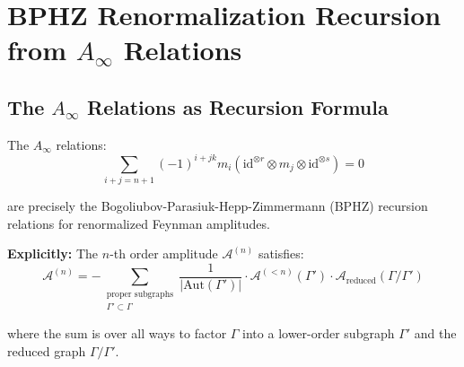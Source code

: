 
\section{BPHZ Renormalization Recursion from $A_\infty$ Relations}
\label{sec:bphz-ainfinity}

\subsection{The $A_\infty$ Relations as Recursion Formula}

\begin{theorem}[BPHZ Recursion = $A_\infty$ Consistency]
\label{thm:bphz-recursion}
The $A_\infty$ relations:
$$\sum_{i+j=n+1} (-1)^{i+jk} m_i(\text{id}^{\otimes r} \otimes m_j \otimes 
\text{id}^{\otimes s}) = 0$$

are precisely the Bogoliubov-Parasiuk-Hepp-Zimmermann (BPHZ) recursion relations 
for renormalized Feynman amplitudes.

\textbf{Explicitly:} The $n$-th order amplitude $\mathcal{A}^{(n)}$ satisfies:
$$\mathcal{A}^{(n)} = -\sum_{\substack{\text{proper subgraphs} \\ \Gamma' \subset \Gamma}} 
\frac{1}{|\text{Aut}(\Gamma')|} \cdot \mathcal{A}^{(<n)}(\Gamma') \cdot 
\mathcal{A}_{\text{reduced}}(\Gamma/\Gamma')$$

where the sum is over all ways to factor $\Gamma$ into a lower-order subgraph $\Gamma'$ 
and the reduced graph $\Gamma/\Gamma'$.
\end{theorem}

